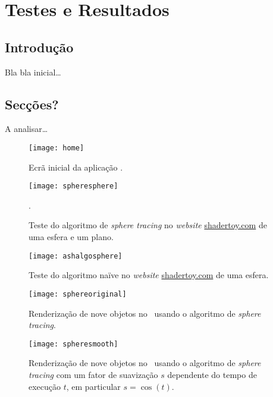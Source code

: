 \chapter{Testes e Resultados}
\label{ch::testes}

\section{Introdução}
\label{sec::testes:intro}

Bla bla inicial\ldots


\section{Secções?}
A analisar\ldots


\begin{figure}[!htbp]
	\centering
	\texttt{[image: home]}
	\caption[Ecrã inicial da aplicação]{Ecrã inicial da aplicação \theapp.}
	\label{fig::home}
\end{figure}

\begin{figure}[!htbp]
	\centering
	\texttt{[image: spheresphere]}
	\caption[Teste do algoritmo de \textit{sphere tracing}]{Teste do algoritmo de \textit{sphere tracing} no \textit{website} \url{shadertoy.com} de uma esfera e um plano.}.
	\label{fig::spheresphere}
\end{figure}

\begin{figure}[!htbp]
	\centering
	\texttt{[image: ashalgosphere]}
	\caption[Teste do algoritmo naïve]{Teste do algoritmo naïve no \textit{website} \url{shadertoy.com} de uma esfera.}
	\label{fig::ashalgosphere}
\end{figure}

\begin{figure}[!htbp]
	\centering
	\texttt{[image: sphereoriginal]}
	\caption[Nove objetos com \textit{sphere tracing} no \theapp]{Renderização de nove objetos no \theapp~usando o algoritmo de \textit{sphere tracing}.}
	\label{fig::sphereoriginal}
\end{figure}

\begin{figure}[!htbp]
	\centering
	\texttt{[image: spheresmooth]}
	\caption[Nove objetos com \textit{sphere tracing} e suavização no \theapp]{Renderização de nove objetos no \theapp~usando o algoritmo de \textit{sphere tracing} com um fator de suavização $s$ dependente do tempo de execução $t$, em particular $s = \cos(t)$.}
	\label{fig::spheresmooth}
\end{figure}

